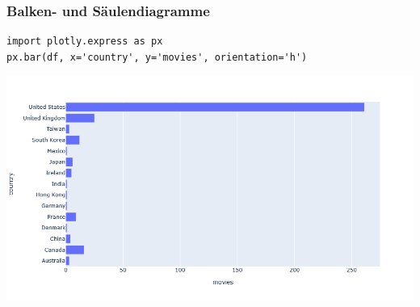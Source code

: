 \begin{frame}[fragile]
\frametitle{Balken- und Säulendiagramme}

\begin{verbatim}
import plotly.express as px
px.bar(df, x='country', y='movies', orientation='h')
\end{verbatim}

\vspace{-\baselineskip}

\begin{center}
\includegraphics[width=0.85\linewidth]{fig5/bar2.png}
\end{center}
\end{frame}


